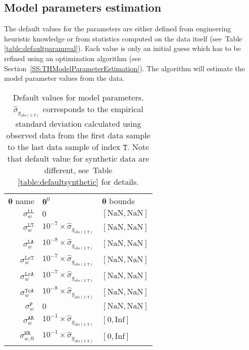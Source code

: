 \subsection{Model parameters estimation}
\label{S:PARAMESTIMATION}

The default values for the parameters are either defined from engineering heuristic knowledge or from statistics computed on the data itself (see~Table \ref{table:defaultparamreal}).
Each value is only an initial guess which has to be refined using an optimization algorithm (see Section~\ref{SS:THModelParameterEstimation}). 
The algorithm will estimate the model parameter values from the data.

\begin{table}[h!]
\caption{Default values for model parameters. $\hat{\sigma}_{y_{obs(1:\mathtt{T})}}$ corresponds to the empirical standard deviation calculated using observed data from the first data sample to the last data sample of index $\mathtt{T}$. Note that default value for synthetic data are different, see~Table \ref{table:defaultsynthetic} for details.} 
\centering
\begin{tabular}{r|ll}
\hline
$\bm{\theta}$ name  & $\bm{\theta}^{0}$ & $\bm{\theta}$ bounds \\\cmidrule(lr){1-3}
$\sigma_{w}^{\mathtt{LL}}$  &  $0$ & $[\text{NaN},\text{NaN}]$ \\
$\sigma_{w}^{\mathtt{LT}} $ &  $10^{-7}\times\hat{\sigma}_{y_{obs(1:\mathtt{T})}}$ & $[\text{NaN},\text{NaN}]$ \\
$\sigma_{w}^{\mathtt{LA}} $ &  $10^{-8}\times\hat{\sigma}_{y_{obs(1:\mathtt{T})}}$ & $[\text{NaN},\text{NaN}]$ \\
$\sigma_{w}^{\mathtt{LcT}} $ &  $10^{-7}\times\hat{\sigma}_{y_{obs(1:\mathtt{T})}}$ & $[\text{NaN},\text{NaN}]$ \\
$\sigma_{w}^{\mathtt{LcA}} $ &  $10^{-7}\times\hat{\sigma}_{y_{obs(1:\mathtt{T})}}$ & $[\text{NaN},\text{NaN}]$ \\
$\sigma_{w}^{\mathtt{TcA}} $ &  $10^{-8}\times\hat{\sigma}_{y_{obs(1:\mathtt{T})}}$ & $[\text{NaN},\text{NaN}]$ \\
$\sigma_{w}^{\mathtt{P}} $ &  $0$ & $[\text{NaN},\text{NaN}]$ \\
$\sigma_{w}^{\mathtt{AR}} $ &  $10^{-1}\times\hat{\sigma}_{y_{obs(1:\mathtt{T})}}$ & $[0,\text{Inf}]$ \\
$\sigma_{w,0}^{\mathtt{KR}}  $ &  $10^{-1}\times\hat{\sigma}_{y_{obs(1:\mathtt{T})}}$  & $[0,\text{Inf}]$ \\

\end{tabular}
\end{table}
